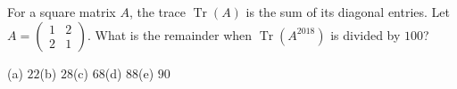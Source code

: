 For a square matrix $A$, the trace $\operatorname{Tr}(A)$ is the sum of its diagonal entries. Let $A=\begin{pmatrix}1&2\\2&1\end{pmatrix}$. What is the remainder when $\operatorname{Tr}\left(A^{2018}\right)$ is divided by $100$?

(a) $22$\quad (b) $28$\quad (c) $68$\quad (d) $88$\quad (e) $90$
